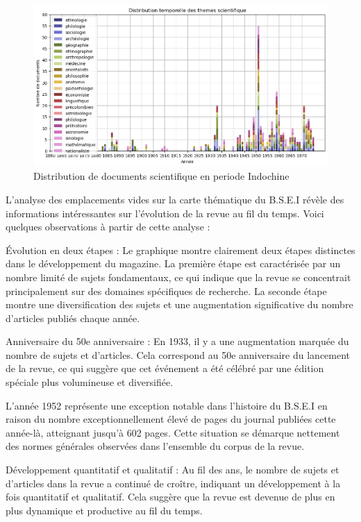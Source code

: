 \begin{figure}[H] %
    \centering
    \includegraphics[width=14cm]{img/all_theme_year_scientifique.png}
    \caption{ Distribution de documents scientifique en periode Indochine}
    \label{fig:all_theme_year_scientifique}
\end{figure}

L'analyse des emplacements vides sur la carte thématique du B.S.E.I révèle des informations intéressantes sur l'évolution de la revue au fil du temps. Voici quelques observations à partir de cette analyse :

Évolution en deux étapes : Le graphique montre clairement deux étapes distinctes dans le développement du magazine. La première étape est caractérisée par un nombre limité de sujets fondamentaux, ce qui indique que la revue se concentrait principalement sur des domaines spécifiques de recherche. La seconde étape montre une diversification des sujets et une augmentation significative du nombre d'articles publiés chaque année.

Anniversaire du 50e anniversaire : En 1933, il y a une augmentation marquée du nombre de sujets et d'articles. Cela correspond au 50e anniversaire du lancement de la revue, ce qui suggère que cet événement a été célébré par une édition spéciale plus volumineuse et diversifiée.

L'année 1952 représente une exception notable dans l'histoire du B.S.E.I en raison du nombre exceptionnellement élevé de pages du journal publiées cette année-là, atteignant jusqu'à 602 pages. Cette situation se démarque nettement des normes générales observées dans l'ensemble du corpus de la revue.

Développement quantitatif et qualitatif : Au fil des ans, le nombre de sujets et d'articles dans la revue a continué de croître, indiquant un développement à la fois quantitatif et qualitatif. Cela suggère que la revue est devenue de plus en plus dynamique et productive au fil du temps.

